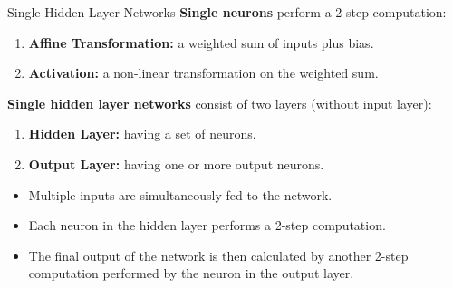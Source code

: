 \begin{vbframe}{Single Hidden Layer Networks}
\textbf{Single neurons} perform a 2-step computation:
\begin{enumerate}
\item \textbf{Affine Transformation:} a weighted sum of inputs plus bias.
\item \textbf{Activation:} a non-linear transformation on the weighted sum.
\end{enumerate}
\vspace{.5cm}
\textbf{Single hidden layer networks} consist of two layers (without input layer):
\begin{enumerate}
\item \textbf{Hidden Layer:} having a set of neurons.
\item \textbf{Output Layer:} having one or more output neurons.
\end{enumerate}
\vspace{.5cm}
\begin{itemize}
\item Multiple inputs are simultaneously fed to the network.
\vspace{.2cm}
\item Each neuron in the hidden layer performs a 2-step computation.
\vspace{.2cm}
\item The final output of the network is then calculated by another 2-step computation performed by the neuron in the output layer.
\end{itemize}
\end{vbframe}

